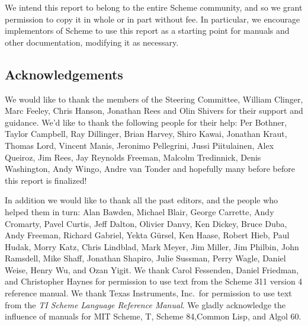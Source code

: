 \medskip

We intend this report to belong to the entire Scheme community, and so
we grant permission to copy it in whole or in part without fee.  In
particular, we encourage implementors of Scheme to use this report as
a starting point for manuals and other documentation, modifying it as
necessary.




\subsection*{Acknowledgements}

We would like to thank the members of the Steering Committee, William
Clinger, Marc Feeley, Chris Hanson, Jonathan Rees and Olin Shivers for
their support and guidance.  We'd like to thank the following people
for their help:
Per Bothner, Taylor Campbell, Ray Dillinger, Brian Harvey, Shiro Kawai,
Jonathan Kraut, Thomas Lord, Vincent Manis, Jeronimo Pellegrini,
Jussi Piitulainen, Alex Queiroz, Jim Rees, Jay Reynolds Freeman,
Malcolm Tredinnick, Denis Washington, Andy Wingo, Andre van Tonder and
hopefully many before before this report is finalized!

In addition we would like to thank all the past editors, and the
people who helped them in turn: Alan Bawden, Michael
Blair, George Carrette, Andy Cromarty, Pavel Curtis, Jeff Dalton, Olivier Danvy,
Ken Dickey, Bruce Duba,
Andy Freeman, Richard Gabriel, Yekta G\"ursel, Ken Haase, Robert
Hieb, Paul Hudak, Morry Katz, Chris Lindblad, Mark Meyer, Jim Miller, Jim Philbin,
John Ramsdell, Mike Shaff, Jonathan Shapiro, Julie Sussman,
Perry Wagle, Daniel Weise, Henry Wu, and Ozan Yigit.
We thank Carol Fessenden, Daniel
Friedman, and Christopher Haynes for permission to use text from the Scheme 311
version 4 reference manual.  We thank Texas Instruments, Inc.~for permission to
use text from the {\em TI Scheme Language Reference Manual}\cite{TImanual85}.
We gladly acknowledge the influence of manuals for MIT Scheme\cite{MITScheme},
T\cite{Rees84}, Scheme 84\cite{Scheme84},Common Lisp\cite{CLtL},
and Algol 60\cite{Naur63}.


